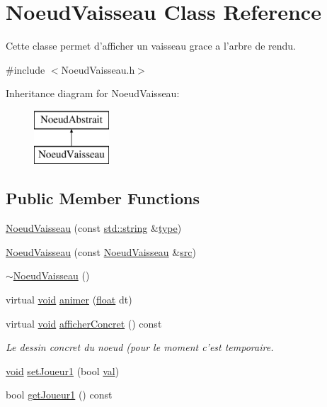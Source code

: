 \hypertarget{class_noeud_vaisseau}{\section{Noeud\-Vaisseau Class Reference}
\label{class_noeud_vaisseau}
}


Cette classe permet d'afficher un vaisseau grace a l'arbre de rendu.  




{\ttfamily \#include $<$Noeud\-Vaisseau.\-h$>$}

Inheritance diagram for Noeud\-Vaisseau\-:\begin{figure}[H]
\begin{center}
\leavevmode
\includegraphics[height=2.000000cm]{class_noeud_vaisseau}
\end{center}
\end{figure}
\subsection*{Public Member Functions}
\begin{DoxyCompactItemize}
\item 
\hyperlink{class_noeud_vaisseau_a5b772aa4f6424fa19e072c2522192b59}{Noeud\-Vaisseau} (const \hyperlink{glew_8h_ae84541b4f3d8e1ea24ec0f466a8c568b}{std\-::string} \&\hyperlink{fmod_8h_a5338b9cb3874378d7e5adfbe80a8a381}{type})
\item 
\hyperlink{class_noeud_vaisseau_aa45a235d6467858a9b59df04dc4aaf22}{Noeud\-Vaisseau} (const \hyperlink{class_noeud_vaisseau}{Noeud\-Vaisseau} \&\hyperlink{glew_8h_a72e0fdf0f845ded60b1fada9e9195cd7}{src})
\item 
\hyperlink{class_noeud_vaisseau_a3d40bc09ebbc6a9639903cbd39df6cb3}{$\sim$\-Noeud\-Vaisseau} ()
\item 
virtual \hyperlink{wglew_8h_aeea6e3dfae3acf232096f57d2d57f084}{void} \hyperlink{class_noeud_vaisseau_ad5421fd22f086186ec172cc0ec82ae3a}{animer} (\hyperlink{fmod_8h_aeb841aa4b4b5f444b5d739d865b420af}{float} dt)
\item 
virtual \hyperlink{wglew_8h_aeea6e3dfae3acf232096f57d2d57f084}{void} \hyperlink{class_noeud_vaisseau_a74af850f9d984cd99b86b46664eb3d74}{afficher\-Concret} () const 
\begin{DoxyCompactList}\small\item\em Le dessin concret du noeud (pour le moment c'est temporaire. \end{DoxyCompactList}\item 
\hyperlink{wglew_8h_aeea6e3dfae3acf232096f57d2d57f084}{void} \hyperlink{class_noeud_vaisseau_ab842bcf24f9553cdc7deea03ebb4eac5}{set\-Joueur1} (bool \hyperlink{glew_8h_a26942fd2ed566ef553eae82d2c109c8f}{val})
\item 
bool \hyperlink{class_noeud_vaisseau_a95995ec949f7cb34cef018f967cff09b}{get\-Joueur1} () const 
\end{DoxyCompactItemize}
